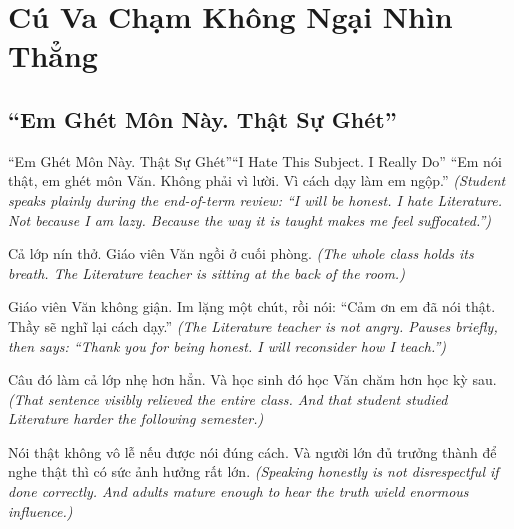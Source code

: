 
\chapter{Cú Va Chạm Không Ngại Nhìn Thẳng}

\section{``Em Ghét Môn Này. Thật Sự Ghét''}
\begin{truyen}{``Em Ghét Môn Này. Thật Sự Ghét''}{``I Hate This Subject. I Really Do''}
 ``Em nói thật, em ghét môn Văn. Không phải vì lười. Vì cách dạy làm em ngộp.''
\textit{(Student speaks plainly during the end-of-term review: ``I will be honest. I hate Literature. Not because I am lazy. Because the way it is taught makes me feel suffocated.'')}

Cả lớp nín thở. Giáo viên Văn ngồi ở cuối phòng.
\textit{(The whole class holds its breath. The Literature teacher is sitting at the back of the room.)}

Giáo viên Văn không giận. Im lặng một chút, rồi nói: ``Cảm ơn em đã nói thật. Thầy sẽ nghĩ lại cách dạy.''
\textit{(The Literature teacher is not angry. Pauses briefly, then says: ``Thank you for being honest. I will reconsider how I teach.'')}

Câu đó làm cả lớp nhẹ hơn hẳn. Và học sinh đó học Văn chăm hơn học kỳ sau.
\textit{(That sentence visibly relieved the entire class. And that student studied Literature harder the following semester.)}

\begin{baihoc}
Nói thật không vô lễ nếu được nói đúng cách. Và người lớn đủ trưởng thành để nghe thật thì có sức ảnh hưởng rất lớn.
\textit{(Speaking honestly is not disrespectful if done correctly. And adults mature enough to hear the truth wield enormous influence.)}
\end{baihoc}
\end{truyen}

